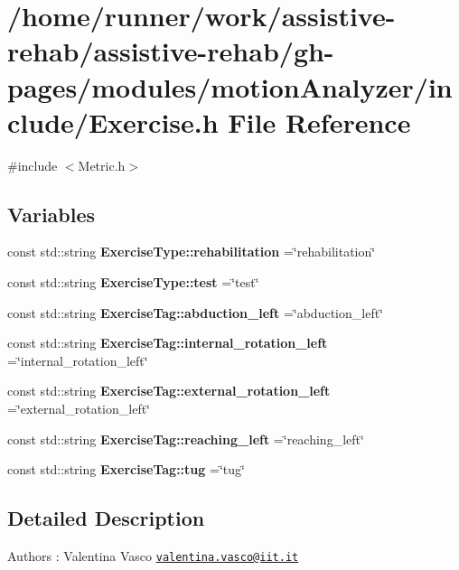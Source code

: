 \section{/home/runner/work/assistive-\/rehab/assistive-\/rehab/gh-\/pages/modules/motion\+Analyzer/include/\+Exercise.h File Reference}
\label{Exercise_8h}
{\ttfamily \#include $<$Metric.\+h$>$}\newline
\subsection*{Variables}
\begin{DoxyCompactItemize}
\item 
\mbox{\label{Exercise_8h_ad3d299b4cbdcf9590a34383c9769552b}} 
const std\+::string {\bfseries Exercise\+Type\+::rehabilitation} =\char`\"{}rehabilitation\char`\"{}
\item 
\mbox{\label{Exercise_8h_a1b9417d7d699f4c9615ac6ca865c2b24}} 
const std\+::string {\bfseries Exercise\+Type\+::test} =\char`\"{}test\char`\"{}
\item 
\mbox{\label{Exercise_8h_a677cff5d00b858887bfc87459677f4c3}} 
const std\+::string {\bfseries Exercise\+Tag\+::abduction\+\_\+left} =\char`\"{}abduction\+\_\+left\char`\"{}
\item 
\mbox{\label{Exercise_8h_aa57cd043979311c1e1dfb6fe25c311e9}} 
const std\+::string {\bfseries Exercise\+Tag\+::internal\+\_\+rotation\+\_\+left} =\char`\"{}internal\+\_\+rotation\+\_\+left\char`\"{}
\item 
\mbox{\label{Exercise_8h_a85804e87dc5e4ce068563687f55eebe6}} 
const std\+::string {\bfseries Exercise\+Tag\+::external\+\_\+rotation\+\_\+left} =\char`\"{}external\+\_\+rotation\+\_\+left\char`\"{}
\item 
\mbox{\label{Exercise_8h_ae4590339042bcaf138b615ef43fd4ce0}} 
const std\+::string {\bfseries Exercise\+Tag\+::reaching\+\_\+left} =\char`\"{}reaching\+\_\+left\char`\"{}
\item 
\mbox{\label{Exercise_8h_a340ab8f95503666972bfff376c1f6627}} 
const std\+::string {\bfseries Exercise\+Tag\+::tug} =\char`\"{}tug\char`\"{}
\end{DoxyCompactItemize}


\subsection{Detailed Description}
\begin{DoxyAuthor}{Authors}
\+: Valentina Vasco \href{mailto:valentina.vasco@iit.it}{\tt valentina.\+vasco@iit.\+it} 
\end{DoxyAuthor}
